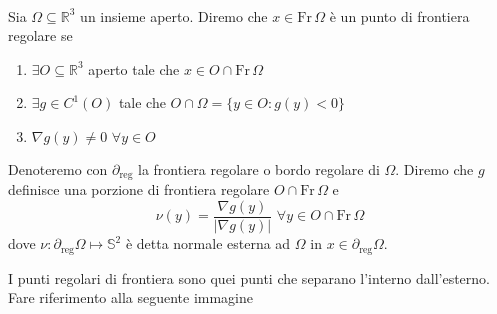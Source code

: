 \begin{definition} \hspace{1cm} \\
	Sia $\Omega \subseteq \mathbb{R}^3$ un insieme aperto. Diremo che $x \in \text{Fr} \, \Omega$ è un punto di frontiera regolare se
	\begin{enumerate}[label=\protect\circled{\arabic*}]
		\item $\exists O \subseteq \mathbb{R}^3$ aperto tale che $x \in O \cap \text{Fr} \, \Omega$
		\item $\exists g \in C^1(O)$ tale che $O \cap \Omega = \{y \in O : g(y) < 0 \}$
		\item $\nabla g(y) \neq 0 \, \, \forall y \in O$
	\end{enumerate}
	Denoteremo con $\partial_{\text{reg}}$ la frontiera regolare o bordo regolare di $\Omega$. Diremo che $g$ definisce una porzione di frontiera regolare
	$O \cap \text{Fr} \, \Omega$ e
	$$
	\nu(y) = \frac{\nabla g(y)}{|\nabla g(y)|} \, \, \forall y \in O \cap \text{Fr} \, \Omega
	$$
	dove $\nu: \partial_{\text{reg}} \Omega \mapsto \mathbb{S}^2$ è detta normale esterna ad $\Omega$ in $x \in \partial_{\text{reg}} \Omega$.
\end{definition}
\begin{remark}
I punti regolari di frontiera sono quei punti che separano l'interno dall'esterno. Fare riferimento alla seguente immagine
\begin{figure}[H]
    \centering
\end{figure}
\end{remark}
